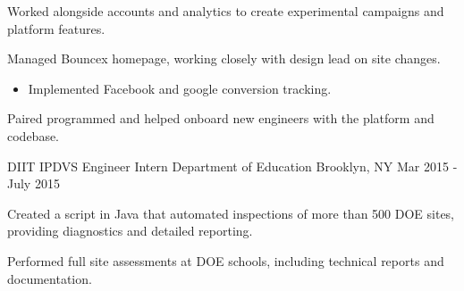 \begin{cventries}
{\begin{cvitems}
\begin{itemize}[leftmargin=5.5mm]
        \end{itemize}
        \item{Worked alongside accounts and analytics to create experimental campaigns and platform features.}
        \item{Managed Bouncex homepage, working closely with design lead on site changes.}
        \begin{itemize}[leftmargin=5.5mm]
        \item[\bullet]{Implemented Facebook and google conversion tracking.}
        \end{itemize}
        \item{Paired programmed and helped onboard new engineers with the platform and codebase.}
      \end{cvitems}
    }
  \cventry
    {DIIT IPDVS Engineer Intern}
    {Department of Education }
    {Brooklyn, NY}
    {Mar 2015 - July 2015}
    {
      \begin{cvitems}
        \item {Created a script in Java that automated inspections of more than 500 DOE sites, providing diagnostics and detailed reporting.}
        \item{Performed full site assessments at DOE schools, including technical reports and documentation.}
      \end{cvitems}
    }
\end{cventries}
